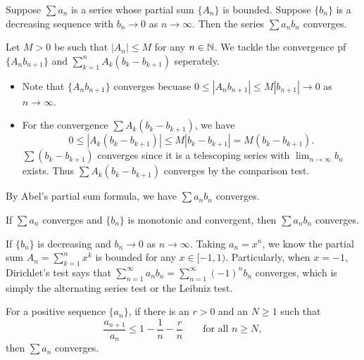     \begin{theoremenv}
        Suppose $\sum a_n$ is a series whose partial sum $\{A_n\}$ is bounded. Suppose $\{b_n\}$ is a decreasing sequence with $b_n \to 0$ as $n\to \infty$. Then the series $ \sum a_n b_n$ converges.

        
    \end{theoremenv}
    \begin{proofenv}
        Let $M>0$ be such that $|A_n| \le M$ for any $n\in \mathbb{N}$. We tackle the convergence pf $\{A_n b_{n+1}\}$ and $\displaystyle \sum_{k=1}^n A_k (b_k - b_{k+1}) $ seperately. 
        
        \begin{itemize}
            \item Note that $\{A_nb_{n+1}\}$ converges becuase $0 \le |A_n b_{n+1} | \le M |b_{n+1}| \to 0$ as $n\to \infty$. 
            \item For the convergence $\sum A_k(b_k - b_{k+1})$, we have
            \[
            0 \le |A_k(b_k - b_{k+1})| \le M|b_k - b_{k+1}| = M(b_k - b_{k+1}).
            \]
            $\sum (b_k - b_{k+1})$ converges since it is a telescoping series with $\displaystyle \lim_{n\to \infty} b_n$ exists. Thus $\sum A_k(b_k - b_{k+1})$ converges by the comparison test.
        \end{itemize}
        By Abel's partial sum formula, we have $\sum a_n b_n$ converges.
    \end{proofenv}
    \begin{theoremenv}
        If $\sum a_n$ converges and $\{b_n\}$ is monotonic and convergent, then $\sum a_n b_n$ converges.

        
    \end{theoremenv}
    \begin{remarkenv}
        If $\{b_n\}$ is decreasing and $b_n \to 0$ as $n\to \infty$. Taking $a_n = x^n$, we know the partial sum $\displaystyle A_n = \sum_{k=1}^n x^k$ is bounded for any $x\in [-1,1)$. Particularly, when $x=-1$, Dirichlet's test  says that $\displaystyle \sum_{n=1}^\infty a_nb_n = \sum_{n=1}^\infty (-1)^n b_n$ converges, which is simply the alternating series test or the Leibniz test.
    \end{remarkenv}
    \begin{lemmaenv}
        For a positive sequence \(\{a_n\}\), if there is an \(r>0\) and an \(N\ge 1\) such that
        \[
        \frac{a_{n+1}}{a_n}
        \le
        1-\frac{1}{n}-\frac{r}{n}
        \qquad
        \text{for all } n\ge N,
        \]
        then \(\sum a_n\) converges.
    \end{lemmaenv}

